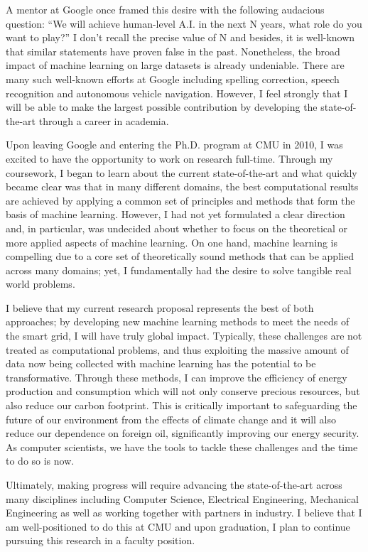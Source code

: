\documentclass[12pt]{article}
\begin{document}
A mentor at Google once framed this desire with the following audacious question: ``We will achieve human-level A.I. in the next N years, what role do you want to play?'' I don't recall the precise value of N  and besides, it is well-known that similar statements have proven false in the past. Nonetheless, the broad impact of machine learning on large datasets is already undeniable. There are many such well-known efforts at Google including spelling correction, speech recognition and autonomous vehicle navigation. However, I feel strongly that I will be able to make the largest possible contribution by developing the state-of-the-art through a career in academia.

Upon leaving Google and entering the Ph.D. program at CMU in 2010, I was excited to have the opportunity to work on research full-time. Through my coursework,
I began to learn about the current state-of-the-art and what quickly became clear was that in many different domains, the best computational results are achieved by applying a common set of principles and methods that form the basis of machine learning. However, I had not yet formulated a clear direction and, in particular, was undecided about whether to focus on the theoretical or more applied aspects of machine learning. On one hand, machine learning is compelling due to a core set of theoretically sound methods that can be applied across many domains; yet, I fundamentally had the desire to solve tangible real world problems. 

I believe that my current research proposal represents the best of both approaches; by developing new machine learning methods to meet the needs of the smart grid, I will have truly global impact. Typically, these challenges are not treated as computational problems, and thus exploiting the massive amount of data now being collected with machine learning has the potential to be transformative. Through these methods, I can improve the efficiency of energy production and consumption which will not only conserve precious resources, but also reduce our carbon footprint. This is critically important to safeguarding the future of our environment from the effects of climate change and it will also reduce our dependence on foreign oil, significantly improving our energy security. As computer scientists, we have the tools to tackle these challenges and the time to do so is now. 

Ultimately, making progress will require advancing the state-of-the-art across many disciplines including Computer Science, Electrical Engineering, Mechanical Engineering as well as working together with partners in industry. I believe that I am well-positioned to do this at CMU and upon graduation, I plan to continue pursuing this research in a faculty position.

\renewcommand{\refname}{\vskip -1.5cm}
\footnotesize


\end{document}
